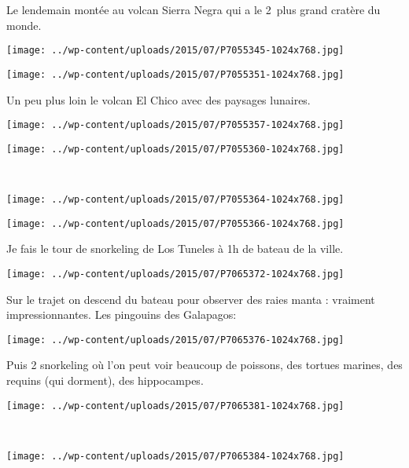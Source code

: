 Le lendemain montée au volcan Sierra Negra qui a le 2\ieme\ plus grand cratère du monde. 
\begin{center} \texttt{[image: ../wp-content/uploads/2015/07/P7055345-1024x768.jpg]} \end{center}
\begin{center} \texttt{[image: ../wp-content/uploads/2015/07/P7055351-1024x768.jpg]} \end{center}
\vspace{-\topsep}
\vspace{-2.75mm}
\pagebreak

Un peu plus loin le volcan El Chico avec des paysages lunaires. 
\begin{center} \texttt{[image: ../wp-content/uploads/2015/07/P7055357-1024x768.jpg]} \end{center}
\begin{center} \texttt{[image: ../wp-content/uploads/2015/07/P7055360-1024x768.jpg]} \end{center}
\vspace{-\topsep}
\vspace{-3.25mm}
\pagebreak
~
\begin{center} \texttt{[image: ../wp-content/uploads/2015/07/P7055364-1024x768.jpg]} \end{center}
\begin{center} \texttt{[image: ../wp-content/uploads/2015/07/P7055366-1024x768.jpg]} \end{center}
\vspace{-\topsep}
\vspace{-3.25mm}
\pagebreak

Je fais le tour de snorkeling de Los Tuneles à 1h de bateau de la ville. \\
\begin{center} \texttt{[image: ../wp-content/uploads/2015/07/P7065372-1024x768.jpg]} \end{center}

Sur le trajet on descend du bateau pour observer des raies manta : vraiment impressionnantes. 
Les pingouins des Galapagos: 
\begin{center} \texttt{[image: ../wp-content/uploads/2015/07/P7065376-1024x768.jpg]} \end{center}
\vspace{-\topsep}
\pagebreak

Puis 2 snorkeling où l'on peut voir beaucoup de poissons, des tortues marines, des requins (qui dorment), des hippocampes. 
\begin{center} \texttt{[image: ../wp-content/uploads/2015/07/P7065381-1024x768.jpg]} \end{center}
~\\
\begin{center} \texttt{[image: ../wp-content/uploads/2015/07/P7065384-1024x768.jpg]} \end{center}
\vspace{-\topsep}
\pagebreak

